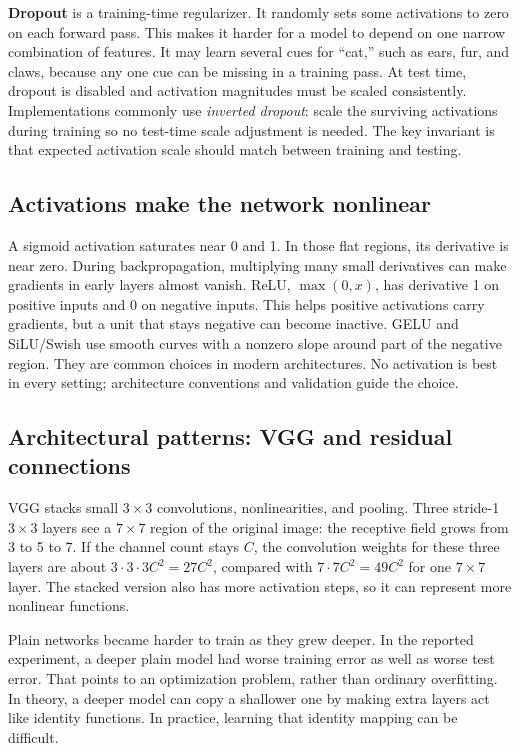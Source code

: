 \textbf{Dropout} is a training-time regularizer. It randomly sets some activations to zero on each forward pass. This makes it harder for a model to depend on one narrow combination of features. It may learn several cues for ``cat,'' such as ears, fur, and claws, because any one cue can be missing in a training pass. At test time, dropout is disabled and activation magnitudes must be scaled consistently. Implementations commonly use \emph{inverted dropout}: scale the surviving activations during training so no test-time scale adjustment is needed. The key invariant is that expected activation scale should match between training and testing.

\subsection{Activations make the network nonlinear}\label{04-visual-computing-ii-ch031-activations-make-the-network-nonlinear}

A sigmoid activation saturates near 0 and 1. In those flat regions, its derivative is near zero. During backpropagation, multiplying many small derivatives can make gradients in early layers almost vanish. ReLU, \(\max(0,x)\), has derivative 1 on positive inputs and 0 on negative inputs. This helps positive activations carry gradients, but a unit that stays negative can become inactive. GELU and SiLU/Swish use smooth curves with a nonzero slope around part of the negative region. They are common choices in modern architectures. No activation is best in every setting; architecture conventions and validation guide the choice.

\subsection{Architectural patterns: VGG and residual connections}\label{04-visual-computing-ii-ch031-architectural-patterns-vgg-and-residual-connections}

VGG stacks small \(3\times3\) convolutions, nonlinearities, and pooling. Three stride-1 \(3\times3\) layers see a \(7\times7\) region of the original image: the receptive field grows from 3 to 5 to 7. If the channel count stays \(C\), the convolution weights for these three layers are about \(3\cdot3\cdot3C^2=27C^2\), compared with \(7\cdot7C^2=49C^2\) for one \(7\times7\) layer. The stacked version also has more activation steps, so it can represent more nonlinear functions.

Plain networks became harder to train as they grew deeper. In the reported experiment, a deeper plain model had worse training error as well as worse test error. That points to an optimization problem, rather than ordinary overfitting. In theory, a deeper model can copy a shallower one by making extra layers act like identity functions. In practice, learning that identity mapping can be difficult.

